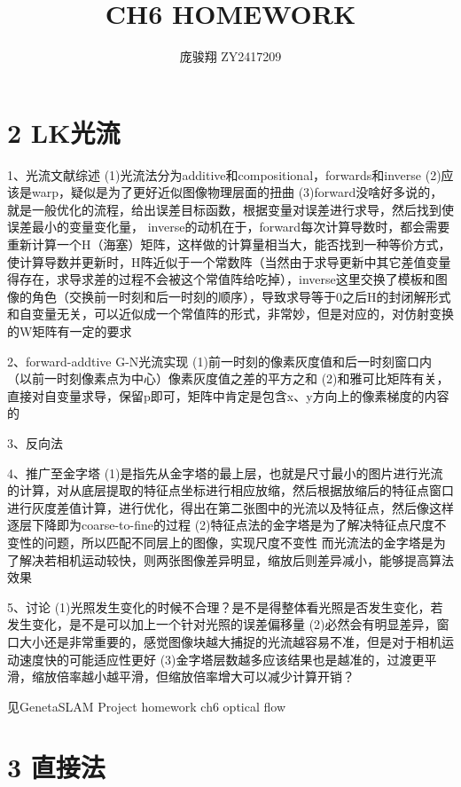 \documentclass[12pt, a4paper, oneside]{ctexart}
\title{\vspace{-4cm}\bfseries{CH6 HOMEWORK}}
\author{\large 庞骏翔 \quad ZY2417209}  %
\date{}
\begin{document}
	
	\pagestyle{plain}
	\maketitle
	\section{2 LK光流}
	
	1、光流文献综述
	(1)光流法分为additive和compositional，forwards和inverse
	(2)应该是warp，疑似是为了更好近似图像物理层面的扭曲
	(3)forward没啥好多说的，就是一般优化的流程，给出误差目标函数，根据变量对误差进行求导，然后找到使误差最小的变量变化量，
	inverse的动机在于，forward每次计算导数时，都会需要重新计算一个H（海塞）矩阵，这样做的计算量相当大，能否找到一种等价方式，使计算导数并更新时，H阵近似于一个常数阵（当然由于求导更新中其它差值变量得存在，求导求差的过程不会被这个常值阵给吃掉），inverse这里交换了模板和图像的角色（交换前一时刻和后一时刻的顺序），导致求导等于0之后H的封闭解形式和自变量无关，可以近似成一个常值阵的形式，非常妙，但是对应的，对仿射变换的W矩阵有一定的要求
	
	2、forward-addtive G-N光流实现
	(1)前一时刻的像素灰度值和后一时刻窗口内（以前一时刻像素点为中心）像素灰度值之差的平方之和
	(2)和雅可比矩阵有关，直接对自变量求导，保留p即可，矩阵中肯定是包含x、y方向上的像素梯度的内容的
	
	3、反向法
	
	4、推广至金字塔
	(1)是指先从金字塔的最上层，也就是尺寸最小的图片进行光流的计算，对从底层提取的特征点坐标进行相应放缩，然后根据放缩后的特征点窗口进行灰度差值计算，进行优化，得出在第二张图中的光流以及特征点，然后像这样逐层下降即为coarse-to-fine的过程
	(2)特征点法的金字塔是为了解决特征点尺度不变性的问题，所以匹配不同层上的图像，实现尺度不变性
	而光流法的金字塔是为了解决若相机运动较快，则两张图像差异明显，缩放后则差异减小，能够提高算法效果
	
	5、讨论
	(1)光照发生变化的时候不合理？是不是得整体看光照是否发生变化，若发生变化，是不是可以加上一个针对光照的误差偏移量
	(2)必然会有明显差异，窗口大小还是非常重要的，感觉图像块越大捕捉的光流越容易不准，但是对于相机运动速度快的可能适应性更好
	(3)金字塔层数越多应该结果也是越准的，过渡更平滑，缩放倍率越小越平滑，但缩放倍率增大可以减少计算开销？
	
	见GenetaSLAM Project homework ch6 optical flow
	
	\section{3 直接法}
	
\end{document}
